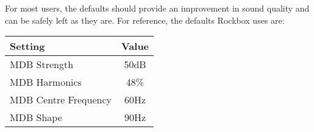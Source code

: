 {\begin{description}
    For most users, the defaults should provide an improvement in sound
    quality and can be safely left as they are.  For reference, the defaults
    Rockbox uses are:
    \begin{table}[h!]
      \begin{center}
        \begin{tabular}{@{}lc@{}}\toprule
          Setting & Value \\\midrule
          MDB Strength & 50dB \\
          MDB Harmonics & 48\% \\
          MDB Centre Frequency & 60Hz \\
          MDB Shape & 90Hz \\\bottomrule
        \end{tabular}
      \end{center}
    \end{table}
      
  \end{description}
}

